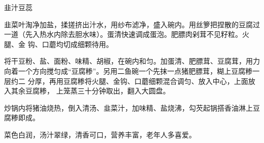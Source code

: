 %
%
%
%
%
%
%
\begin{recipe}{韭汁豆蕊}

\ingredients


\preparation

\step 韭菜叶淘净加盐，揉搓挤出汁水，用纱布滤净，盛入碗内。用丝箩把捏散的豆腐过
一道（先入热水内除去胆水味）。蛋清快速调成蛋泡。肥膘肉剁茸不见籽粒。火腿、金
钩、口蘑均切成细颗待用。

\step 将干豆粉、盐、面粉、味精、胡椒，在碗内和匀。加蛋清、肥膘茸、豆腐茸，用力
向着一个方向搅匀成“豆腐糁”。另用二鱼碗一个先抹一点猪肥膘茸，糊上豆腐糁一层约二
分厚，再用豆腐糁将火腿、金钩、口蘑细颗混合调匀、放入中心，上面放入其余豆腐糁，
上笼蒸三十分钟取出，翻入大圆盘。

\step 炒锅内将猪油烧热，倒入清汤、韭菜汁，加味精、盐烧沸，勾芡起锅搭香油淋上豆
腐糁即成。

\features

菜色白润，汤汁翠绿，清香可口，营养丰富，老年人多喜爱。

\end{recipe}

